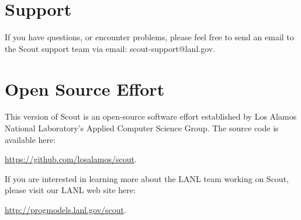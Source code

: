 \section*{Support}
If you have questions, or encounter problems, please feel free to send an email
to the Scout support team via email: {\color{scoutblue}scout-support@lanl.gov}.

\section*{Open Source Effort}
This version of Scout is an open-source software effort established by Los Alamos
National Laboratory's Applied Computer Science Group. The source code is available here: 
\begin{center} 
	{\color{scoutblue}\url{https://github.com/losalamos/scout}}.
\end{center}

If you are interested in learning more about the LANL team working on Scout, please visit our LANL web site here:
\begin{center} 
	{\color{scoutblue}\url{http://progmodels.lanl.gov/scout}}.
\end{center}






